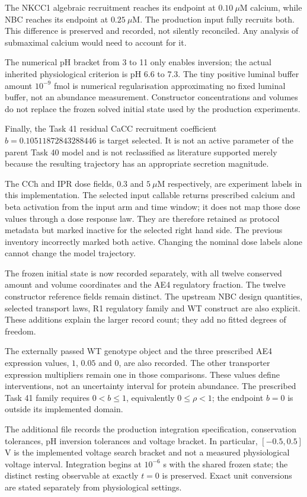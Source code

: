 The NKCC1 algebraic recruitment reaches its endpoint at $0.10\ \mu$M calcium, while NBC reaches its endpoint at $0.25\ \mu$M. The production input fully recruits both. This difference is preserved and recorded, not silently reconciled. Any analysis of submaximal calcium would need to account for it.

The numerical pH bracket from 3 to 11 only enables inversion; the actual inherited physiological criterion is pH 6.6 to 7.3. The tiny positive luminal buffer amount $10^{-9}$ fmol is numerical regularisation approximating no fixed luminal buffer, not an abundance measurement. Constructor concentrations and volumes do not replace the frozen solved initial state used by the production experiments.

Finally, the Task 41 residual CaCC recruitment coefficient $b=0.10511872843288446$ is target selected. It is not an active parameter of the parent Task 40 model and is not reclassified as literature supported merely because the resulting trajectory has an appropriate secretion magnitude.

The CCh and IPR dose fields, $0.3$ and $5\ \mu$M respectively, are experiment labels in this implementation. The selected input callable returns prescribed calcium and beta activation from the input arm and time window; it does not map those dose values through a dose response law. They are therefore retained as protocol metadata but marked inactive for the selected right hand side. The previous inventory incorrectly marked both active. Changing the nominal dose labels alone cannot change the model trajectory.

The frozen initial state is now recorded separately, with all twelve conserved amount and volume coordinates and the AE4 regulatory fraction. The twelve constructor reference fields remain distinct. The upstream NBC design quantities, selected transport laws, R1 regulatory family and WT construct are also explicit. These additions explain the larger record count; they add no fitted degrees of freedom.

The externally passed WT genotype object and the three prescribed AE4 expression values, $1$, $0.05$ and $0$, are also recorded. The other transporter expression multipliers remain one in those comparisons. These values define interventions, not an uncertainty interval for protein abundance. The prescribed Task 41 family requires $0<b\leq1$, equivalently $0\leq\rho<1$; the endpoint $b=0$ is outside its implemented domain.

The additional file  records the production integration specification, conservation tolerances, pH inversion tolerances and voltage bracket. In particular, $[-0.5,0.5]$ V is the implemented voltage search bracket and not a measured physiological voltage interval. Integration begins at $10^{-6}$ s with the shared frozen state; the distinct resting observable at exactly $t=0$ is preserved. Exact unit conversions are stated separately from physiological settings.

